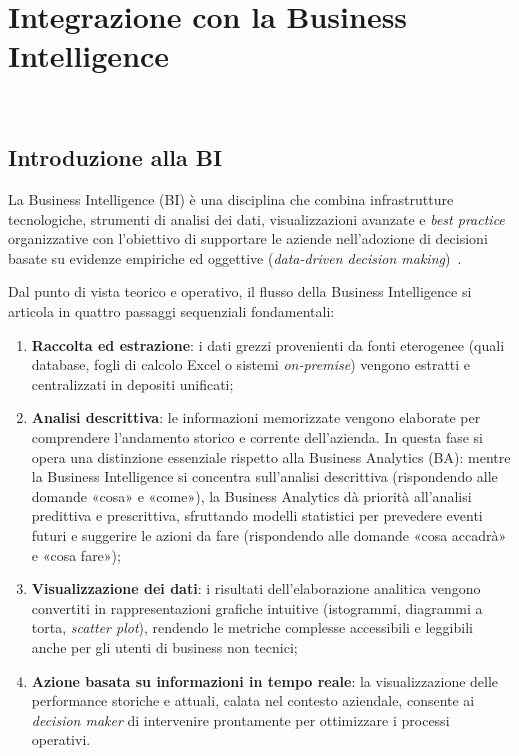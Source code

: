 \chapter{Integrazione con la Business Intelligence}
\label{cap:business-intelligence}

\\

\section{Introduzione alla BI}
La Business Intelligence (BI) è una disciplina che combina infrastrutture tecnologiche, strumenti di analisi dei dati, visualizzazioni avanzate e \emph{best practice} 
organizzative con l'obiettivo di supportare le aziende nell'adozione di decisioni basate su evidenze empiriche ed oggettive (\emph{data-driven decision making})~\cite{site:business-intelligence}.

Dal punto di vista teorico e operativo, il flusso della Business Intelligence si articola in quattro passaggi sequenziali fondamentali:
\begin{enumerate}
    \item \textbf{Raccolta ed estrazione}: i dati grezzi provenienti da fonti eterogenee (quali database, fogli di calcolo Excel o sistemi \emph{on-premise}) vengono estratti e centralizzati in depositi unificati;
    \item \textbf{Analisi descrittiva}: le informazioni memorizzate vengono elaborate per comprendere l'andamento storico e corrente dell'azienda. In questa fase si opera una distinzione essenziale rispetto alla Business Analytics (BA): mentre la Business Intelligence si concentra sull'analisi descrittiva (rispondendo alle domande «cosa» e «come»), la Business Analytics dà priorità all'analisi predittiva e prescrittiva, sfruttando modelli statistici per prevedere eventi futuri e suggerire le azioni da fare (rispondendo alle domande «cosa accadrà» e «cosa fare»);
    \item \textbf{Visualizzazione dei dati}: i risultati dell'elaborazione analitica vengono convertiti in rappresentazioni grafiche intuitive (istogrammi, diagrammi a torta, \emph{scatter plot}), rendendo le metriche complesse accessibili e leggibili anche per gli utenti di business non tecnici;
    \item \textbf{Azione basata su informazioni in tempo reale}: la visualizzazione delle performance storiche e attuali, calata nel contesto aziendale, consente ai \emph{decision maker} di intervenire prontamente per ottimizzare i processi operativi.
\end{enumerate}

